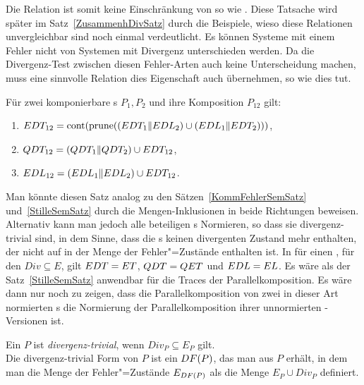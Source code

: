 Die Relation \DRel{} ist somit keine Einschränkung von \ERel{} so wie \QRel{}.
Diese Tatsache wird später im Satz~\ref{ZusammenhDivSatz} durch die Beispiele,
wieso diese Relationen unvergleichbar sind noch einmal verdeutlicht.
Es können Systeme mit einem Fehler nicht von Systemen mit Divergenz
unterschieden werden. Da die Divergenz-Test zwischen diesen \glqq
Fehler-Arten\grqq{} auch keine Unterscheidung machen, muss eine sinnvolle
Relation dies Eigenschaft auch übernehmen, so wie \DRel{} dies tut.

\begin{Satz}
  \label{DivSemSatz}
  Für zwei komponierbare \MEIO{}s $P_1,P_2$ und ihre Komposition $P_{12}$ gilt:
  \begin{enumerate}
    \item $EDT _{12} =\mathrm{cont} (\mathrm{prune} ((EDT _1\|EDL _2)\cup (EDL _1\|EDT
      _2)))$,
    \item $QDT _{12} =(QDT _1\|QDT _2)\cup EDT _{12}$,
    \item $EDL _{12} =(EDL _1\|EDL _2)\cup EDT _{12}$.
  \end{enumerate}
\end{Satz}

Man könnte diesen Satz analog zu den Sätzen~\ref{KommFehlerSemSatz}
und~\ref{StilleSemSatz} durch die Mengen-Inklusionen in beide Richtungen
beweisen. Alternativ kann man jedoch alle beteiligen \MEIO{}s Normieren, so
dass sie divergenz-trivial sind, in dem Sinne, dass die \MEIO{}s keinen
divergenten Zustand mehr enthalten, der nicht auf in der Menge der
Fehler"=Zustände enthalten ist. In für einen \MEIO{}, für den $Div\subseteq E$,
gilt $EDT = ET$, $QDT = QET$ und $EDL = EL$. Es wäre als der
Satz~\ref{StilleSemSatz} anwendbar für die Traces der Parallelkomposition. Es
wäre dann nur noch zu zeigen, dass die Parallelkomposition von zwei in dieser
Art normierten \MEIO{}s die Normierung der Parallelkomposition ihrer
unnormierten \MEIO{}-Versionen ist.

\begin{Def}
  \label{DivNormDef}
  Ein \MEIO{} $P$ ist \emph{divergenz-trivial}, wenn $Div _P \subseteq E_P$
  gilt.\\
  Die divergenz-trivial Form von $P$ ist ein \MEIO{} $DF (P)$, das man aus $P$
  erhält, in dem man die Menge der Fehler"=Zustände $E_{DF (P)}$ als die Menge
  $E_P \cup Div _P$ definiert.
\end{Def}

